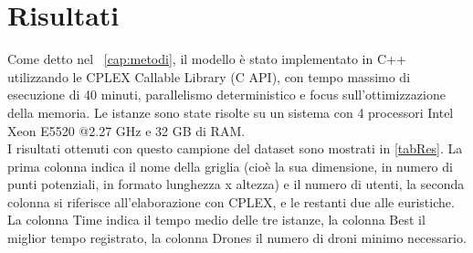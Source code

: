\section{Risultati}
Come detto nel \chaptername\ \ref{cap:metodi}, il modello è stato implementato in C++ utilizzando le CPLEX Callable Library (C API), con tempo massimo di esecuzione di 40 minuti, parallelismo deterministico e focus sull'ottimizzazione della memoria. Le istanze sono state risolte su un sistema con 4 processori Intel Xeon E5520 @2.27 GHz e 32 GB di RAM. \\
I risultati ottenuti con questo campione del dataset sono mostrati in \tablename \ref{tabRes}. 
La prima colonna indica il nome della griglia (cioè la sua dimensione, in numero di punti potenziali, in formato lunghezza x altezza) e il numero di utenti, la seconda colonna si riferisce all'elaborazione con CPLEX, e le restanti due alle euristiche. La colonna Time indica il tempo medio delle tre istanze, la colonna Best il miglior tempo registrato, la colonna Drones il numero di droni minimo necessario.  \\
%
\setlength{\tabcolsep}{3.5 pt}
\renewcommand\arraystretch{1.1}
